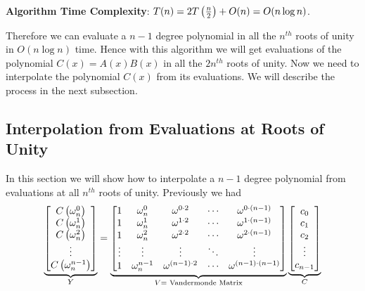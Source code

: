 \textbf{Algorithm Time Complexity}: $T(n)=2T\left(\frac{n}2\right)+O(n)=O(n\log n)$.\parinn

 Therefore we can evaluate a $n-1$ degree polynomial in all the $n^{th}$ roots of unity in $O(n\log n)$ time. Hence with this algorithm we will get evaluations of the polynomial $C(x)=A(x)B(x)$ in all the $2n^{th}$ roots of unity. Now we need to interpolate the polynomial $C(x)$ from its evaluations. We will describe the process in the next subsection.
 \subsection{Interpolation from Evaluations at Roots of Unity}In this section we will show how to interpolate a $n-1$ degree polynomial from evaluations at all $n^{th}$ roots of unity. Previously we had $$\underbrace{\left[\begin{matrix}C\left(\omega^0_n\right)\\ C\left(\omega^1_n\right)\\ C\left(\omega^2_n\right)\\ \vdots\\ C\left(\omega^{n-1}_n\right)\end{matrix}\right]}_{Y}=\underbrace{\left[\begin{matrix}1 & \omega^0_n & \omega ^{0\cdot 2}& \cdots & \omega^{0\cdot (n-1)}\\  1 & \omega^1_n & \omega ^{1\cdot 2}& \cdots & \omega^{1\cdot (n-1)}\\ 1 & \omega^2_n & \omega ^{2\cdot 2}& \cdots & \omega^{2\cdot (n-1)}\\ \vdots & \vdots & \vdots & \ddots & \vdots\\ 1 & \omega^{n-1}_n & \omega ^{(n-1)\cdot 2}& \cdots & \omega^{(n-1)\cdot (n-1)}\end{matrix}\right]}_{V=\text{ Vandermonde Matrix}}\underbrace{\left[\begin{matrix}c_0\\ c_1\\ c_2\\ \vdots \\ c_{n-1}\end{matrix}\right]}_{C}$$
 

